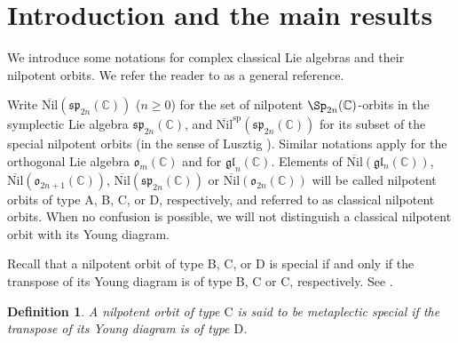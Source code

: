 \documentclass[12pt,a4paper]{amsart}
\def\fgl{\mathfrak{gl}}
\newcommand{\BC}{{\mathbb {C}}}
\newcommand{\g}{\mathfrak g}
\newcommand{\p}{\mathfrak p}
\renewcommand{\l}{\mathfrak l}
\newcommand{\s}{\mathfrak s}
\renewcommand{\o}{\mathfrak o}
\newcommand{\R}{\mathbb R}
\numberwithin{equation}{section}
\newtheorem{defn}[thm]{Definition}
\theoremstyle{remark}
\begin{document}
\maketitle






\section{Introduction and the main results}\label{sec:intro}






We introduce some notations for complex classical Lie algebras and their nilpotent orbits. We refer the reader to \cite{CM} as a general reference.

Write $\overline{\mathrm{Nil}}(\s\p_{2n}(\BC))$ ($n \geq 0$) for the set of nilpotent $\Sp_{2n}(\BC)$-orbits in the symplectic  Lie algebra $\s\p_{2n}(\BC)$, and $\overline{\mathrm{Nil}}^{\mathrm{sp}}(\s\p_{2n}(\BC))$ for its subset of the special nilpotent orbits (in the sense of Lusztig \cite{Lu}). Similar notations apply for the orthogonal Lie algebra $\o_{m}(\BC)$ and for $\fgl_n(\BC)$.
Elements of $\overline{\mathrm{Nil}} (\g\l_n(\BC))$, $\overline{\mathrm{Nil}}(\o_{2n+1}(\BC))$, $\overline{\mathrm{Nil}}(\s\p_{2n}(\BC))$ or  $\overline{\mathrm{Nil}}(\o_{2n}(\BC))$ will be called nilpotent orbits of type A, B, C, or D, respectively, and referred to as classical nilpotent orbits. When no confusion is possible, we will not distinguish a classical nilpotent orbit with its Young diagram.

Recall that a nilpotent orbit of type B, C, or D is special if and only if the transpose of its Young diagram is of type B, C or C, respectively. See \cite[Section 6.3]{CM}.

\begin{defn}
A nilpotent orbit of type $\mathrm C$ is said to be metaplectic special if the transpose of its Young diagram is of type $\mathrm D$.
\end{defn}
\end{document}
